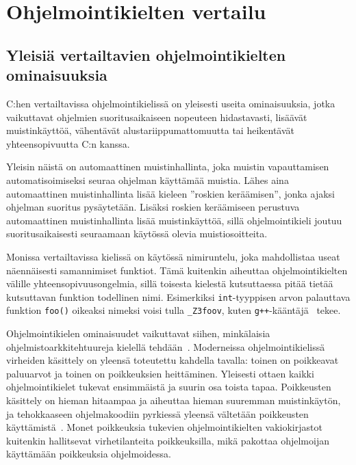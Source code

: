 \section{Ohjelmointikielten vertailu}
\label{sec:muut}

\subsection{Yleisiä vertailtavien ohjelmointikielten ominaisuuksia}

C:hen vertailtavissa ohjelmointikielissä on yleisesti useita ominaisuuksia,
jotka vaikuttavat ohjelmien suoritusaikaiseen nopeuteen hidastavasti, lisäävät
muistinkäyttöä, vähentävät alustariippumattomuutta tai heikentävät
yhteensopivuutta C:n kanssa.

Yleisin näistä on automaattinen muistinhallinta, joka muistin vapauttamisen
automatisoimiseksi seuraa ohjelman käyttämää muistia. Lähes aina automaattinen
muistinhallinta lisää kieleen ''roskien keräämisen'', jonka ajaksi ohjelman suoritus pysäytetään. Lisäksi roskien
keräämiseen perustuva automaattinen muistinhallinta lisää muistinkäyttöä, sillä
ohjelmointikieli joutuu suoritusaikaisesti seuraamaan käytössä olevia
muistiosoitteita.

Monissa vertailtavissa kielissä on käytössä nimiruntelu,
joka mahdollistaa useat näennäisesti samannimiset funktiot. Tämä kuitenkin
aiheuttaa ohjelmointikielten välille yhteensopivuusongelmia, sillä toisesta
kielestä kutsuttaessa pitää tietää kutsuttavan funktion todellinen nimi.
Esimerkiksi \texttt{int}-tyyppisen arvon palauttava funktion \texttt{foo()}
oikeaksi nimeksi voisi tulla \texttt{\_Z3foov}, kuten
\texttt{g++}-kääntäjä~\citep{gcc} tekee.

Ohjelmointikielen ominaisuudet vaikuttavat siihen, minkälaisia
ohjelmistoarkkitehtuureja kielellä tehdään~\citep{designpatternsdesign}.
Moderneissa ohjelmointikielissä virheiden käsittely on yleensä toteutettu
kahdella tavalla: toinen on poikkeavat paluuarvot ja toinen on poikkeuksien
heittäminen. Yleisesti ottaen kaikki ohjelmointikielet tukevat ensimmäistä ja
suurin osa toista tapaa. Poikkeusten käsittely on hieman hitaampaa ja aiheuttaa
hieman suuremman muistinkäytön, ja tehokkaaseen ohjelmakoodiin pyrkiessä
yleensä vältetään poikkeusten käyttämistä~\citep{exceptioncosts}. Monet
poikkeuksia tukevien ohjelmointikielten vakiokirjastot kuitenkin hallitsevat
virhetilanteita poikkeuksilla, mikä pakottaa ohjelmoijan käyttämään poikkeuksia
ohjelmoidessa.

